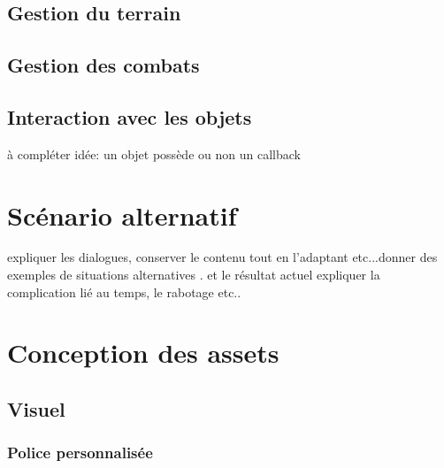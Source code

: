 \documentclass[11pt]{article}
\begin{document}
\subsection{Gestion du terrain}
\subsection{Gestion des combats}
\subsection{Interaction avec les objets}
à compléter idée: un objet possède ou non un callback 


\section{Scénario alternatif}
expliquer les dialogues, conserver le contenu tout en l'adaptant etc...donner des exemples de situations alternatives . et le résultat actuel
expliquer la complication lié au temps, le rabotage etc..
\section{Conception des assets}
\subsection{Visuel}
\subsubsection{Police personnalisée}
\end{document}
